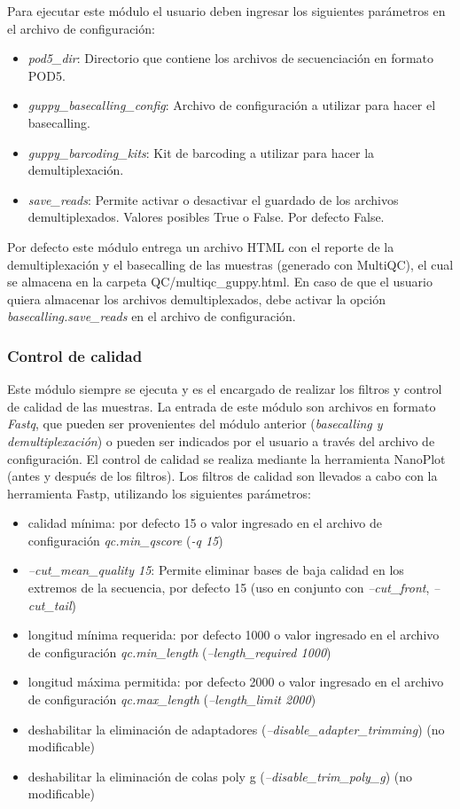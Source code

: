Para ejecutar este módulo el usuario deben ingresar los siguientes parámetros en el archivo de configuración:
\begin{itemize}
    \item \textit{pod5\_dir}: Directorio que contiene los archivos de secuenciación en formato POD5.
    \item \textit{guppy\_basecalling\_config}: Archivo de configuración a utilizar para hacer el basecalling.
    \item \textit{guppy\_barcoding\_kits}: Kit de barcoding a utilizar para hacer la demultiplexación.
    \item \textit{save\_reads}: Permite activar o desactivar el guardado de los archivos demultiplexados. Valores posibles True o False. Por defecto False.
\end{itemize} 

Por defecto este módulo entrega un archivo HTML con el reporte de la demultiplexación y el basecalling de las muestras (generado con MultiQC), el cual se almacena en la carpeta QC/multiqc\_guppy.html.
En caso de que el usuario quiera almacenar los archivos demultiplexados, debe activar la opción \textit{basecalling.save\_reads} en el archivo de configuración.


\subsubsection{Control de calidad}
Este módulo siempre se ejecuta y es el encargado de realizar los filtros y control de calidad de las muestras.
La entrada de este módulo son archivos en formato \textit{Fastq}, que pueden ser provenientes del módulo anterior (\textit{basecalling y demultiplexación}) o pueden ser indicados por el usuario a través del archivo de configuración.
El control de calidad se realiza mediante la herramienta NanoPlot (antes y después de los filtros).
Los filtros de calidad son llevados a cabo con la herramienta Fastp, utilizando los siguientes parámetros:
\begin{itemize}
    \item calidad mínima: por defecto 15 o valor ingresado en el archivo de configuración \textit{qc.min\_qscore} (\textit{-q 15})
    \item \textit{--cut\_mean\_quality 15}: Permite eliminar bases de baja calidad en los extremos de la secuencia, por defecto 15 (uso en conjunto con \textit{--cut\_front}, \textit{--cut\_tail})
    \item longitud mínima requerida: por defecto 1000 o valor ingresado en el archivo de configuración \textit{qc.min\_length} (\textit{--length\_required 1000}) 
    \item longitud máxima permitida: por defecto 2000 o valor ingresado en el archivo de configuración \textit{qc.max\_length} (\textit{--length\_limit 2000})
    \item deshabilitar la eliminación de adaptadores (\textit{--disable\_adapter\_trimming}) (no modificable)
    \item deshabilitar la eliminación de colas poly g (\textit{--disable\_trim\_poly\_g}) (no modificable)
\end{itemize}

